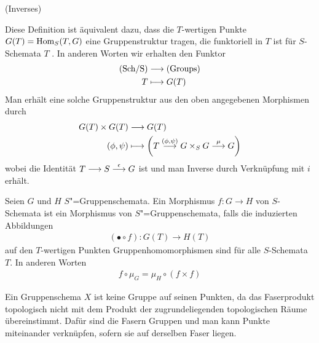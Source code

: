 \documentclass[german]{scrreprt}
\begin{document}
\begin{Definition}[$S$"=Gruppenschema]
\begin{enumerate}[label=(\alph*)]
    \hfill(Inverses)
  \end{enumerate}
  \begin{Bemerkung}
    Diese Definition ist äquivalent dazu, dass die $T$-wertigen Punkte
    $G(T)=\operatorname{Hom}_S(T,G)$ eine Gruppenstruktur tragen, die funktoriell in
    $T$ ist für $S$-Schemata $T$ \cite[Chapter (4.15)]{wedhorn}. 
    In anderen Worten wir erhalten den Funktor 
    \begin{align*}
      \text{(Sch/S)} &\longrightarrow \text{(Groups)}\\
      T &\longmapsto G(T)
    \end{align*}
    Man erhält eine solche Gruppenstruktur aus den oben angegebenen
    Morphismen durch
    \begin{align*}
      G(T)\times G(T) &\longrightarrow G(T)\\
      (\phi, \psi) &\longmapsto 
                     \left(
                     T\overset{(\phi,\psi)}{\longrightarrow} G\times_S G
                     \overset\mu{\longrightarrow} G
                     \right)
    \end{align*}
    wobei die Identität $T\longrightarrow S\overset{\epsilon}{\longrightarrow} G$ ist und
    man Inverse durch Verknüpfung mit $i$ erhält.
    \cite[Proposition IV.3.2]{silverman2}
  \end{Bemerkung}

  \begin{Definition}
    Seien $G$ und $H$ $S$"=Gruppenschemata.
    Ein Morphismus $f\colon G\to H$ von $S$-Schemata ist ein Morphismus
    von $S$"=Gruppenschemata, falls die induzierten Abbildungen
    \begin{gather*}
      (\bullet\circ f)\colon G(T)\to H(T)
    \end{gather*}auf den $T$-wertigen Punkten
    Gruppenhomomorphismen sind für alle $S$-Schemata $T$.
    In anderen Worten
    \begin{gather*}
      f\circ\mu_G = \mu_H\circ(f\times f)
    \end{gather*}
    \cite[Definition 4.42]{wedhorn}
  \end{Definition}

  \begin{Bemerkung}
    Ein Gruppenschema $X$ ist keine Gruppe auf seinen Punkten, da das
    Faserprodukt topologisch nicht mit dem Produkt der zugrundeliegenden
    topologischen Räume übereinstimmt.
    Dafür sind die Fasern Gruppen und man kann Punkte miteinander
    verknüpfen, sofern sie auf derselben Faser liegen.
  \end{Bemerkung}


\end{Definition}
\end{document}
